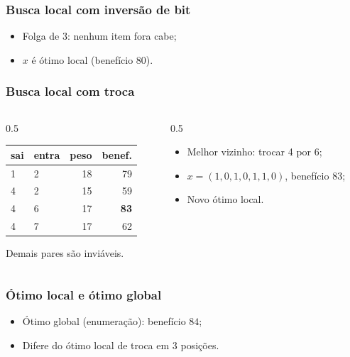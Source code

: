 \documentclass[fleqn]{beamer}
\newcommand{\vetor}[2]{%
	\foreach \v [count=\i] in {#2}{%
		\node[bit\v] at (\i*0.65,#1) {\v};
	}%
}
\begin{document}
\begin{frame}
	\frametitle{Busca local com inversão de bit}
	\begin{itemize}
		\item Folga de $3$: nenhum item fora cabe;
		\item $x$ é ótimo local (benefício $80$).
	\end{itemize}
\end{frame}

\begin{frame}
	\frametitle{Busca local com troca}
	\begin{columns}[T]
	\begin{column}{0.5\textwidth}
	\begin{center}
	\begin{tabular}{llrr}
		\toprule
		sai & entra & peso & benef. \\
		\midrule
		1 & 2 & 18 & 79 \\
		4 & 2 & 15 & 59 \\
		4 & 6 & 17 & \textbf{83} \\
		4 & 7 & 17 & 62 \\
		\bottomrule
	\end{tabular}
	\end{center}
	{\scriptsize Demais pares são inviáveis.}
	\end{column}
	\begin{column}{0.5\textwidth}
	\begin{itemize}
		\item Melhor vizinho: trocar 4 por 6;
		\item $x = (1,0,1,0,1,1,0)$, benefício $83$;
		\item Novo ótimo local.
	\end{itemize}
	\end{column}
	\end{columns}
\end{frame}

\begin{frame}
	\frametitle{Ótimo local e ótimo global}
	\begin{itemize}
		\item Ótimo global (enumeração): benefício $84$;
		\item Difere do ótimo local de troca em 3 posições.
	\end{itemize}
	\vspace{2mm}
	\begin{center}
	\end{center}
\end{frame}
\end{document}
